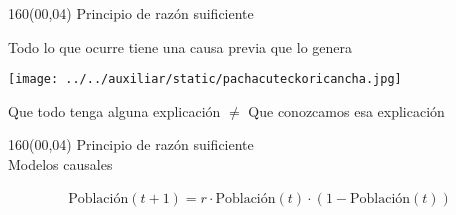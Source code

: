 \documentclass[shownotes,aspectratio=169]{beamer}
\begin{document}
\begin{frame}[plain]
\begin{textblock}{160}(00,04)
\centering
\LARGE Principio de razón suificiente
\end{textblock}
\vspace{1.5cm} \Large

\centering
Todo lo que ocurre tiene una causa previa que lo genera
\large 

\vspace{.75cm}

\texttt{[image: ../../auxiliar/static/pachacuteckoricancha.jpg]}

\pause

\vspace{.5cm}


Que todo tenga alguna explicación $\neq$ Que conozcamos esa explicación

\end{frame}



\begin{frame}[plain]
\begin{textblock}{160}(00,04)
\centering
\LARGE Principio de razón suificiente \\
\Large Modelos causales
\end{textblock}
\vspace{1cm} 

\begin{align*}
 \text{Población}(t+1) = r \cdot \text{Población}(t)\cdot (1-\text{Población}(t))
\end{align*}

\vspace{0.5cm}

\centering




\end{frame}
\end{document}
